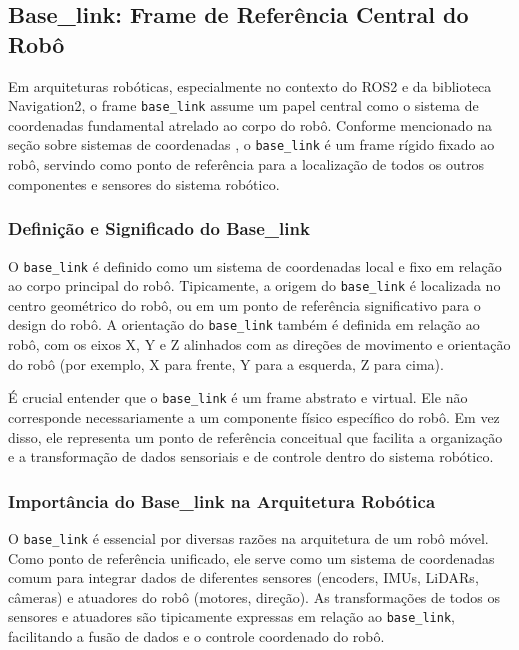 \subsection{Base\_link: Frame de Referência Central do Robô}

Em arquiteturas robóticas, especialmente no contexto do ROS2 e da biblioteca
Navigation2, o frame \texttt{base\_link} assume um papel central como o sistema
de coordenadas fundamental atrelado ao corpo do robô. Conforme mencionado na
seção sobre sistemas de coordenadas \cite{Babu2020Simulator}, o
\texttt{base\_link} é um frame rígido fixado ao robô, servindo como ponto de
referência para a localização de todos os outros componentes e sensores do
sistema robótico.

\subsubsection{Definição e Significado do Base\_link}

O \texttt{base\_link} é definido como um sistema de coordenadas local e fixo em
relação ao corpo principal do robô. Tipicamente, a origem do
\texttt{base\_link} é localizada no centro geométrico do robô, ou em um ponto
de referência significativo para o design do robô. A orientação do
\texttt{base\_link} também é definida em relação ao robô, com os eixos X, Y e Z
alinhados com as direções de movimento e orientação do robô (por exemplo, X
para frente, Y para a esquerda, Z para cima).

É crucial entender que o \texttt{base\_link} é um frame abstrato e virtual. Ele não corresponde necessariamente a um componente físico específico do robô. Em vez disso, ele representa um ponto de referência conceitual que facilita a organização e a transformação de dados sensoriais e de controle dentro do sistema robótico.

\subsubsection{Importância do Base\_link na Arquitetura Robótica}

O \texttt{base\_link} é essencial por diversas razões na arquitetura de um robô
móvel. Como ponto de referência unificado, ele serve como um sistema de
coordenadas comum para integrar dados de diferentes sensores (encoders, IMUs,
LiDARs, câmeras) e atuadores do robô (motores, direção). As transformações de
todos os sensores e atuadores são tipicamente expressas em relação ao
\texttt{base\_link}, facilitando a fusão de dados e o controle coordenado do
robô.

